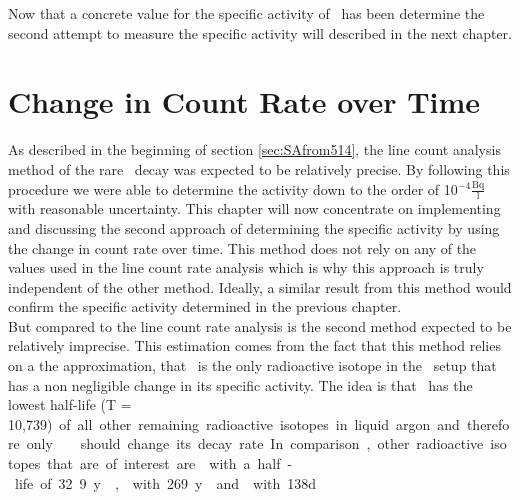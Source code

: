 \documentclass[encoding=utf8,british]{tumphthesis}
\begin{document}
Now that a concrete value for the specific activity of \Kr\ has been determine the second attempt to measure the specific activity will described in the next chapter.
\\  








\chapter{Change in Count Rate over Time}
\label{sec:SAfromDecrease}

As described in the beginning of section \ref{sec:SAfrom514}, the line count analysis method of the rare \Kr\ decay was expected to be relatively precise.
By following this procedure we were able to determine the activity down to the order of 10$^{-4} \frac{\mathrm{Bq}}{\mathrm{l}}$ with reasonable uncertainty.
This chapter will now concentrate on implementing and discussing the second approach of determining the specific activity by using the change in count rate over time.
This method does not rely on any of the values used in the line count rate analysis which is why this approach is truly independent of the other method.
Ideally, a similar result from this method would confirm the specific activity determined in the previous chapter. 
\\

But compared to the line count rate analysis is the second method  expected to be relatively imprecise.  
This estimation comes from the fact that this method relies on a the approximation, that \Kr\ is the only radioactive isotope in the \gerda\ setup that has a non negligible change in its specific activity.
The idea is that \Kr\ has the lowest half-life (T = 10,739\unit) of all other remaining radioactive isotopes in liquid argon and therefore only \Kr\ should change its decay rate.
In comparison, other radioactive isotopes that are of interest are  with a half-life of 32.9 y \cite{chen_nuclear_2016},  with 269 y \cite{singh_nuclear_2006} and  with 138d \cite{kondev_nuclear_2008}.
\\
\end{document}
